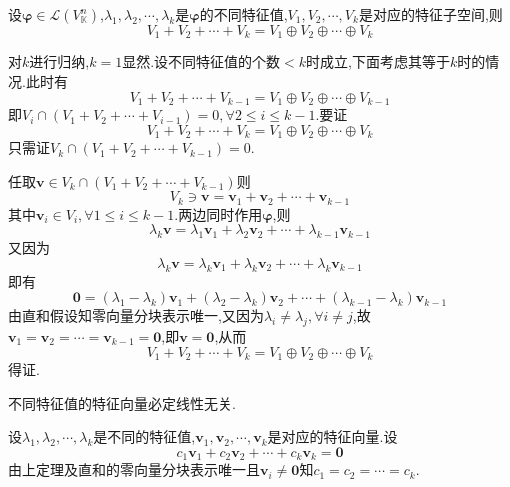 \begin{formal}
\begin{theorem}[特征子空间的和]\label{thm:特征子空间的和}
    设$\bm{\varphi}\in
    \mathcal{L}\left(
        V_{\mathbb{K}}^n
            \right)
    $,$\lambda_1,\lambda_2,\cdots,\lambda_k$是$\bm{\varphi}$的不同特征值,$V_1,V_2,\cdots,V_k$是对应的特征子空间,则
    \[
     V_1+V_2+\cdots+V_k=V_1\oplus 
        V_2\oplus\cdots\oplus V_k
    \]
\end{theorem}
\begin{Proof}
对$k$进行归纳,$k=1$显然.设不同特征值的个数$<k$时成立,下面考虑其等于$k$时的情况.此时有
\[
V_1+V_2+\cdots+V_{k-1}=V_1\oplus 
        V_2\oplus\cdots\oplus V_{k-1}
        \]即$V_i\cap
        \left(
            V_1+V_2+\cdots+V_{i-1}
        \right)=0,\forall 2\leqslant i\leqslant k-1$.要证
        \[
        V_1+V_2+\cdots+V_k=V_1\oplus
        V_2\oplus\cdots\oplus V_k
        \]只需证$V_k\cap
        \left(
            V_1+V_2+\cdots+V_{k-1}
        \right)=0$.

        任取$\bm{v}\in V_k\cap\left(
            V_1+V_2+\cdots+V_{k-1}
        \right)$则
        \[
        V_k \ni \bm{v} = 
        \bm{v}_1+\bm{v}_2+\cdots+\bm{v}_{k-1}
        \]其中$\bm{v}_i\in V_i,\forall 1\leqslant i\leqslant k -1.$两边同时作用$\bm{\varphi}$,则
        \[
         \lambda_k\bm{v} = 
        \lambda_1\bm{v}_1+\lambda_2\bm{v}_2+\cdots+\lambda_{k-1}\bm{v}_{k-1}
        \]又因为
        \[
        \lambda_k\bm{v} = 
        \lambda_k\bm{v}_1+\lambda_k\bm{v}_2+\cdots+\lambda_{k}\bm{v}_{k-1}
        \]即有
        \[
         \bm{0} = 
        \left(
            \lambda_1-\lambda_k
        \right)\bm{v}_1+\left(
            \lambda_2-\lambda_k
        \right)\bm{v}_2+\cdots+\left(
            \lambda_{k-1}-\lambda_k
        \right)\bm{v}_{k-1}
        \]
        由直和假设知零向量分块表示唯一,又因为$\lambda_i\neq \lambda_j,\forall i\neq j$,故$\bm{v}_1=\bm{v}_2=\cdots=\bm{v}_{k-1}=\bm{0}$,即$\bm{v}=\bm{0}$,从而
        \[
        V_1+V_2+\cdots+V_k=V_1\oplus
        V_2\oplus\cdots\oplus V_k
        \]
        得证.\qedhere
\end{Proof}
\end{formal}
\begin{green}
\begin{corollary}[不同特征值的特征向量]\label{cor:不同特征值的特征向量}
    不同特征值的特征向量必定线性无关.
\end{corollary}
\begin{Proof}
设$\lambda_1,\lambda_2,\cdots,\lambda_k$是不同的特征值,$\bm{v}_1,\bm{v}_2,\cdots,\bm{v}_k$是对应的特征向量.设
\[
c_1\bm{v}_1+c_2\bm{v}_2+\cdots+c_k\bm{v}_k=\bm{0}
\]
由上定理及直和的零向量分块表示唯一且$\bm{v}_i\neq \bm{0}$知$c_1=c_2=\cdots=c_k$.
\end{Proof}
\end{green}
